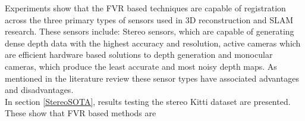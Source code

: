 


Experiments show that the FVR based techniques are capable of registration across the three primary types of sensors used in 3D reconstruction and SLAM research. These sensors include: Stereo sensors, which are capable of generating dense depth data with the highest accuracy and resolution, active cameras which are efficient hardware based solutions to depth generation and monocular cameras, which produce the least accurate and most noisy depth maps. As mentioned in the literature review these sensor types have associated advantages and disadvantages. \\

In section \ref{StereoSOTA}, results testing the stereo Kitti dataset are presented. These show that FVR based methods are  